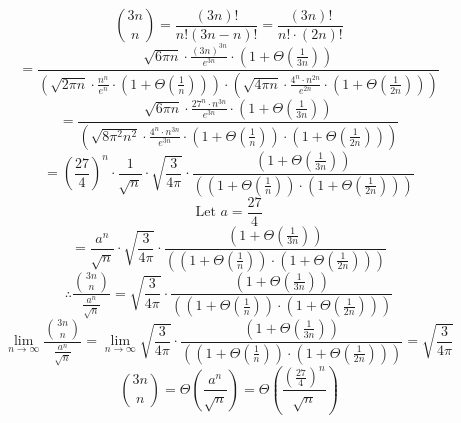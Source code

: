 \documentclass{article}
\begin{document}
$$\binom{3n}{n} = \frac{(3n)!}{n!(3n-n)!} = \frac{(3n)!}{n! \cdot (2n)!}$$
$$= \frac{\sqrt{6\pi n} \cdot \frac{(3n)^{3n}}{e^{3n}} \cdot (1 + \Theta(\frac{1}{3n})) }{(\sqrt{2\pi n} \cdot \frac{n^n}{e^n} \cdot (1 + \Theta(\frac{1}{n})) ) \cdot (\sqrt{4 \pi n} \cdot \frac{4^n \cdot n^{2n}}{e^{2n}} \cdot (1 + \Theta(\frac{1}{2n})))  }$$
$$= \frac{\sqrt{6\pi n} \cdot \frac{27^n \cdot n^{3n}}{e^{3n}} \cdot (1 + \Theta(\frac{1}{3n})) }{(\sqrt{8\pi^2 n^2} \cdot \frac{4^n \cdot n^{3n}}{e^{3n}} \cdot (1 + \Theta(\frac{1}{n})) \cdot (1 + \Theta(\frac{1}{2n})))}$$
$$= (\frac{27}{4})^n \cdot \frac{1}{\sqrt{n}} \cdot \sqrt{\frac{3}{4\pi}} \cdot \frac{(1 + \Theta(\frac{1}{3n})) }{((1 + \Theta(\frac{1}{n})) \cdot (1 + \Theta(\frac{1}{2n})))}$$
$$\text{Let } a = \frac{27}{4}$$
$$= \frac{a^n}{\sqrt{n}} \cdot \sqrt{\frac{3}{4\pi}} \cdot \frac{(1 + \Theta(\frac{1}{3n})) }{((1 + \Theta(\frac{1}{n})) \cdot (1 + \Theta(\frac{1}{2n})))}$$
$$\therefore \frac{\binom{3n}{n}}{\frac{a^n}{\sqrt{n}}} = \sqrt{\frac{3}{4\pi}} \cdot \frac{(1 + \Theta(\frac{1}{3n})) }{((1 + \Theta(\frac{1}{n})) \cdot (1 + \Theta(\frac{1}{2n})))}$$
$$\lim_{n \rightarrow \infty} \frac{\binom{3n}{n}}{\frac{a^n}{\sqrt{n}}} = \lim_{n \rightarrow \infty} \sqrt{\frac{3}{4\pi}} \cdot \frac{(1 + \Theta(\frac{1}{3n})) }{((1 + \Theta(\frac{1}{n})) \cdot (1 + \Theta(\frac{1}{2n})))} = \sqrt{\frac{3}{4\pi}}$$
$$\binom{3n}{n} = \Theta(\frac{a^n}{\sqrt{n}}) = \Theta(\frac{(\frac{27}{4})^n}{\sqrt{n}})$$
\end{document}

